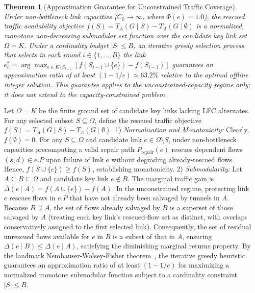 \documentclass[journal]{IEEEtran}
\newtheorem{theorem}{Theorem}
\begin{document}
\begin{theorem}[Approximation Guarantee for Unconstrained Traffic Coverage]
Under non-bottleneck link capacities ($C_k \to \infty$, where $\Phi(e) = 1.0$), the rescued traffic availability objective $f(S) = T_A(G \mid S) - T_A(G \mid \emptyset)$ is a normalized, monotone non-decreasing submodular set function over the candidate key link set $\Omega = K$. Under a cardinality budget $|S| \le B$, an iterative greedy selection process that selects in each round $i \in \{1, \dots, B\}$ the link $e_i^* = \arg\max_{e \in K \setminus S_{i-1}} [f(S_{i-1} \cup \{e\}) - f(S_{i-1})]$ guarantees an approximation ratio of at least $(1 - 1/e) \approx 63.2\%$ relative to the optimal offline integer solution. This guarantee applies to the unconstrained-capacity regime only; it does not extend to the capacity-constrained problem.
\end{theorem}

\begin{IEEEproof}
Let $\Omega = K$ be the finite ground set of candidate key links lacking LFC alternates. For any selected subset $S \subseteq \Omega$, define the rescued traffic objective $f(S) = T_A(G \mid S) - T_A(G \mid \emptyset)$.
1) \textit{Normalization and Monotonicity:} Clearly, $f(\emptyset) = 0$. For any $S \subseteq \Omega$ and candidate link $e \in \Omega \setminus S$, under non-bottleneck capacities precomputing a valid repair path $P_{\text{repair}}(e)$ rescues dependent flows $(s, d) \in e.P$ upon failure of link $e$ without degrading already-rescued flows. Hence, $f(S \cup \{e\}) \ge f(S)$, establishing monotonicity.
2) \textit{Submodularity:} Let $A \subseteq B \subseteq \Omega$ and candidate key link $e \notin B$. The marginal traffic gain is $\Delta(e \mid A) = f(A \cup \{e\}) - f(A)$. In the unconstrained regime, protecting link $e$ rescues flows in $e.P$ that have not already been salvaged by tunnels in $A$. Because $B \supseteq A$, the set of flows already salvaged by $B$ is a superset of those salvaged by $A$ (treating each key link's rescued-flow set as distinct, with overlaps conservatively assigned to the first selected link). Consequently, the set of residual unrescued flows available for $e$ in $B$ is a subset of that in $A$, ensuring $\Delta(e \mid B) \le \Delta(e \mid A)$, satisfying the diminishing marginal returns property.
By the landmark Nemhauser-Wolsey-Fisher theorem~\cite{nemhauser1978analysis}, the iterative greedy heuristic guarantees an approximation ratio of at least $(1 - 1/e)$ for maximizing a normalized monotone submodular function subject to a cardinality constraint $|S| \le B$.
\end{IEEEproof}
\end{document}
